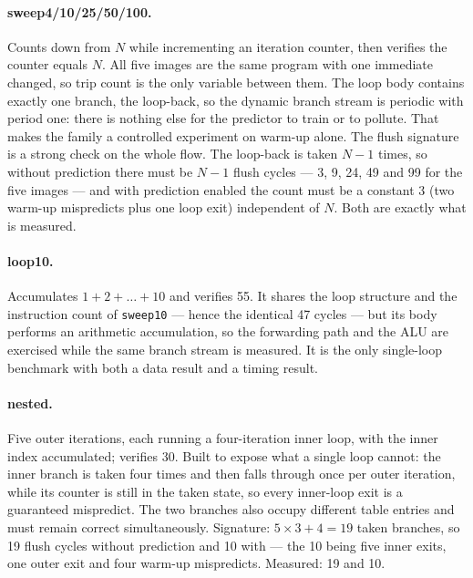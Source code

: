 \documentclass[11pt]{article}
\begin{document}
\paragraph{sweep4/10/25/50/100.} Counts down from $N$ while incrementing an iteration
counter, then verifies the counter equals $N$.
All five images are the same program with one immediate changed, so trip count is the only
variable between them. The loop body contains exactly one branch, the loop-back, so the
dynamic branch stream is periodic with period one: there is nothing else for the predictor
to train or to pollute. That makes the family a controlled experiment on warm-up alone.
The flush signature is a strong check on the whole flow. The loop-back is taken $N-1$
times, so without prediction there must be $N-1$ flush cycles --- 3, 9, 24, 49 and 99 for
the five images --- and with prediction enabled the count must be a constant 3 (two warm-up
mispredicts plus one loop exit) independent of $N$. Both are exactly what is measured.

\paragraph{loop10.} Accumulates $1+2+\dots+10$ and verifies 55.
It shares the loop structure and the instruction count of \texttt{sweep10} --- hence the
identical 47 cycles --- but its body performs an arithmetic accumulation, so the forwarding
path and the ALU are exercised while the same branch stream is measured. It is the only
single-loop benchmark with both a data result and a timing result.

\paragraph{nested.} Five outer iterations, each running a four-iteration inner loop, with
the inner index accumulated; verifies 30.
Built to expose what a single loop cannot: the inner branch is taken four times and then
falls through once per outer iteration, while its counter is still in the taken state, so
every inner-loop exit is a guaranteed mispredict. The two branches also occupy different
table entries and must remain correct simultaneously.
Signature: $5\times3+4=19$ taken branches, so 19 flush cycles without prediction and 10
with --- the 10 being five inner exits, one outer exit and four warm-up mispredicts.
Measured: 19 and 10.
\end{document}
